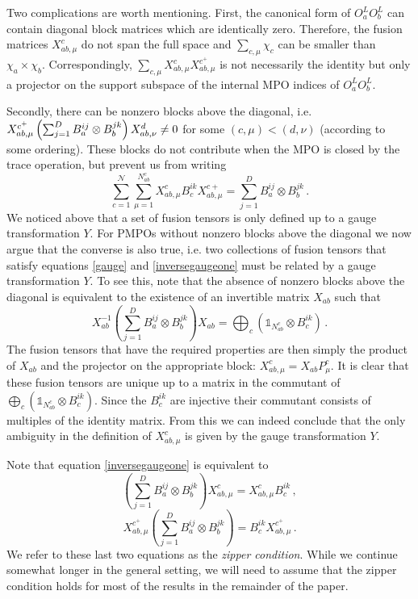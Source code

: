 \documentclass[12 pt]{article}
\begin{document}
Two complications are worth mentioning. First, the canonical form of $O^L_a O^L_b$ can contain diagonal block matrices which are identically zero. Therefore, the fusion matrices $X_{ab,\mu}^{c}$ do not span the full space and $\sum_{c,\mu} \chi_{c}$ can be smaller than $\chi_{a}\times\chi_{b}$. Correspondingly, $\sum_{c,\mu} X^c_{ab,\mu}X^{c^+}_{ab,\mu}$ is not necessarily the identity but only a projector on the support subspace of the internal MPO indices of $O^L_aO^L_b$.

Secondly, there can be nonzero blocks above the diagonal, i.e.\ $X_{ab,\mu}^{c^+}\left(\sum_{j = 1}^D B_a^{ij}\otimes B_b^{jk}\right)\\ X^{d}_{ab,\nu}  \neq 0$ for some $(c,\mu) < (d,\nu)$ (according to some ordering). These blocks do not contribute when the MPO is closed by the trace operation, but prevent us from writing
\begin{equation}\label{inversegaugeone}
\sum_{c = 1}^{\mathcal{N}}\sum_{\mu=1}^{N_{ab}^c} X_{ab,\mu}^c B_c^{ik} X_{ab,\mu}^{c+} = \sum_{j=1}^D B^{ij}_a\otimes B^{jk}_b\, .
\end{equation}
We noticed above that a set of fusion tensors is only defined up to a gauge transformation $Y$. For PMPOs without nonzero blocks above the diagonal we now argue that the converse is also true, i.e. two  collections of fusion tensors that satisfy equations \eqref{gauge} and \eqref{inversegaugeone} must be related by a gauge transformation $Y$. To see this, note that the absence of nonzero blocks above the diagonal is equivalent to the existence of an invertible matrix $X_{ab}$ such that
\begin{equation}
X_{ab}^{-1}\left(\sum_{j = 1}^D B_a^{ij}\otimes B_b^{jk}\right)X_{ab}=  \bigoplus_{c}\left(\mathds{1}_{N_{ab}^c} \otimes B_c^{ik}\right)\, .
\end{equation}
The fusion tensors that have the required properties are then simply the product of $X_{ab}$ and the projector on the appropriate block: $X^c_{ab,\mu} = X_{ab} P^c_{\mu}$. It is clear that these fusion tensors are unique up to a matrix in the commutant of $\bigoplus_{c}\left(\mathds{1}_{N_{ab}^c} \otimes B_c^{ik}\right)$. Since the $B^{ik}_c$ are injective their commutant consists of multiples of the identity matrix. From this we can indeed conclude that the only ambiguity in the definition of $X_{ab,\mu}^c$ is given by the gauge transformation $Y$.

Note that equation \eqref{inversegaugeone} is equivalent to
\begin{equation}\label{zippercondition2}
\left(\sum_{j=1}^D B^{ij}_a\otimes B^{jk}_b\right) X_{ab,\mu}^{c} = X_{ab,\mu}^{c} B^{ik}_{c}\, ,
\end{equation}
\begin{equation*}
X_{ab,\mu}^{c^+} \left(\sum_{j=1}^D B^{ij}_a\otimes B^{jk}_b\right)  =B^{ik}_{c} X_{ab,\mu}^{c^+} \, .
\end{equation*}
We refer to these last two equations as the \emph{zipper condition}. While we continue somewhat longer in the general setting, we will need to assume that the zipper condition holds for most of the results in the remainder of the paper.
\end{document}
